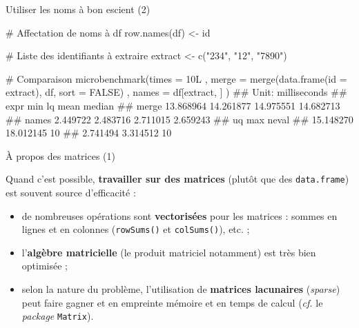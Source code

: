 \documentclass[12pt,handout,ignorenonframetext,]{beamer}
\newenvironment{Shaded}{}{}
\newcommand{\KeywordTok}[1]{\textcolor[rgb]{0.00,0.00,1.00}{{#1}}}
\newcommand{\DataTypeTok}[1]{{#1}}
\newcommand{\StringTok}[1]{\textcolor[rgb]{0.00,0.50,0.50}{{#1}}}
\newcommand{\CommentTok}[1]{\textcolor[rgb]{0.00,0.50,0.00}{{#1}}}
\newcommand{\OtherTok}[1]{\textcolor[rgb]{1.00,0.25,0.00}{{#1}}}
\newcommand{\NormalTok}[1]{{#1}}
\providecommand{\tightlist}{%
\setlength{\itemsep}{0pt}\setlength{\parskip}{0pt}}
\renewenvironment{Shaded}{\begin{snugshade}}{\end{snugshade}}
\begin{document}
\begin{frame}[fragile]{Utiliser les noms à bon escient (2)}

\footnotesize

\begin{Shaded}
\begin{Highlighting}[]
\CommentTok{# Affectation de noms à df }
\KeywordTok{row.names}\NormalTok{(df) <-}\StringTok{ }\NormalTok{id}

\CommentTok{# Liste des identifiants à extraire}
\NormalTok{extract <-}\StringTok{ }\KeywordTok{c}\NormalTok{(}\StringTok{"234"}\NormalTok{, }\StringTok{"12"}\NormalTok{, }\StringTok{"7890"}\NormalTok{)}

\CommentTok{# Comparaison}
\KeywordTok{microbenchmark}\NormalTok{(}\DataTypeTok{times =} \NormalTok{10L}
  \NormalTok{, }\DataTypeTok{merge =} \KeywordTok{merge}\NormalTok{(}\KeywordTok{data.frame}\NormalTok{(}\DataTypeTok{id =} \NormalTok{extract), df, }\DataTypeTok{sort =} \OtherTok{FALSE}\NormalTok{)}
  \NormalTok{, }\DataTypeTok{names =} \NormalTok{df[extract, ]}
\NormalTok{)}
  \NormalTok{## Unit: milliseconds}
  \NormalTok{##   expr       min        lq      mean    median}
  \NormalTok{##  merge 13.868964 14.261877 14.975551 14.682713}
  \NormalTok{##  names  2.449722  2.483716  2.711015  2.659243}
  \NormalTok{##         uq       max neval}
  \NormalTok{##  15.148270 18.012145    10}
  \NormalTok{##   2.741494  3.314512    10}
\end{Highlighting}
\end{Shaded}

\end{frame}

\begin{frame}[fragile]{À propos des matrices (1)}

Quand c'est possible, \textbf{travailler sur des matrices} (plutôt que
des \texttt{data.frame}) est souvent source d'efficacité :

\vfill

\begin{itemize}
\tightlist
\item
  \pause de nombreuses opérations sont \textbf{vectorisées} pour les
  matrices : sommes en lignes et en colonnes (\texttt{rowSums()} et
  \texttt{colSums()}), etc. ;
\end{itemize}

\vfill 

\begin{itemize}
\tightlist
\item
  \pause l'\textbf{algèbre matricielle} (le produit matriciel notamment)
  est très bien optimisée ;
\end{itemize}

\vfill

\begin{itemize}
\tightlist
\item
  \pause selon la nature du problème, l'utilisation de \textbf{matrices
  lacunaires} (\emph{sparse}) peut faire gagner et en empreinte mémoire
  et en temps de calcul (\emph{cf.} le \emph{package} \texttt{Matrix}).
\end{itemize}

\end{frame}
\end{document}

